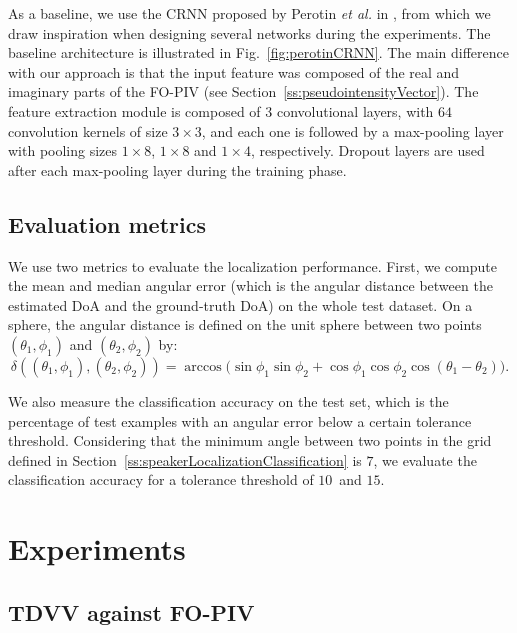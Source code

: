 As a baseline, we use the CRNN proposed by Perotin \emph{et al.} in \cite{perotin_crnn-based_2018}, from which we draw inspiration when designing several networks during the experiments. The baseline architecture is illustrated in Fig.~\ref{fig:perotinCRNN}. The main difference with our approach is that the input feature was composed of the real and imaginary parts of the FO-PIV (see Section~\ref{ss:pseudointensityVector}). The feature extraction module is composed of $3$ convolutional layers, with $64$ convolution kernels of size $3 \times 3$, and each one is followed by a max-pooling layer with pooling sizes $1 \times 8$, $1 \times 8$ and $1 \times 4$, respectively. Dropout layers are used after each max-pooling layer during the training phase.

\subsection{Evaluation metrics}

We use two metrics to evaluate the localization performance. First, we compute the mean and median angular error (which is the angular distance between the estimated DoA and the ground-truth DoA) on the whole test dataset. On a sphere, the angular distance is defined on the unit sphere between two points $(\theta_1,\phi_1)$ and $(\theta_2,\phi_2)$ by:
\begin{equation}
    \delta((\theta_1,\phi_1),(\theta_2,\phi_2)) = \arccos \big( \sin \phi_1 \sin \phi_2 + \cos \phi_1 \cos \phi_2 \cos(\theta_1-\theta_2) \big).
\end{equation}

We also measure the classification accuracy on the test set, which is the percentage of test examples with an angular error below a certain tolerance threshold. Considering that the minimum angle between two points in the grid defined in Section~\ref{ss:speakerLocalizationClassification} is $7$\textdegree, we evaluate the classification accuracy for a tolerance threshold of $10$\textdegree~and $15$\textdegree.

\section{Experiments}
\label{ss:tdvvExperiments}

\subsection{TDVV against FO-PIV}

